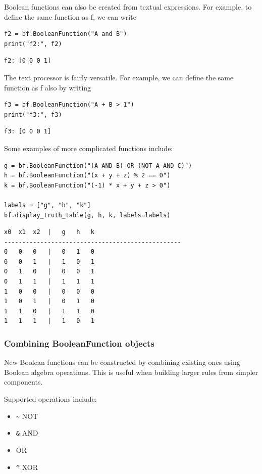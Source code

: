 \documentclass[
]{article}
\providecommand{\tightlist}{%
  \setlength{\itemsep}{0pt}\setlength{\parskip}{0pt}}
\begin{document}
Boolean functions can also be created from textual expressions. For
example, to define the same function as f, we can write

\begin{lstlisting}
f2 = bf.BooleanFunction("A and B")
print("f2:", f2)
\end{lstlisting}

\begin{lstlisting}
f2: [0 0 0 1]
\end{lstlisting}

The text processor is fairly versatile. For example, we can define the
same function as f also by writing

\begin{lstlisting}
f3 = bf.BooleanFunction("A + B > 1")
print("f3:", f3)
\end{lstlisting}

\begin{lstlisting}
f3: [0 0 0 1]
\end{lstlisting}

Some examples of more complicated functions include:

\begin{lstlisting}
g = bf.BooleanFunction("(A AND B) OR (NOT A AND C)")
h = bf.BooleanFunction("(x + y + z) % 2 == 0")
k = bf.BooleanFunction("(-1) * x + y + z > 0")

labels = ["g", "h", "k"]
bf.display_truth_table(g, h, k, labels=labels)
\end{lstlisting}

\begin{lstlisting}
x0  x1  x2  |   g   h   k
-------------------------------------------------
0   0   0   |   0   1   0
0   0   1   |   1   0   1
0   1   0   |   0   0   1
0   1   1   |   1   1   1
1   0   0   |   0   0   0
1   0   1   |   0   1   0
1   1   0   |   1   1   0
1   1   1   |   1   0   1
\end{lstlisting}

\subsubsection{Combining BooleanFunction
objects}\label{combining-booleanfunction-objects}

New Boolean functions can be constructed by combining existing ones
using Boolean algebra operations. This is useful when building larger
rules from simpler components.

Supported operations include:

\begin{itemize}
\tightlist
\item
  \texttt{\textasciitilde{}} NOT
\item
  \texttt{\&} AND
\item
  \texttt{\textbar{}} OR
\item
  \texttt{\^{}} XOR
\end{itemize}
\end{document}
